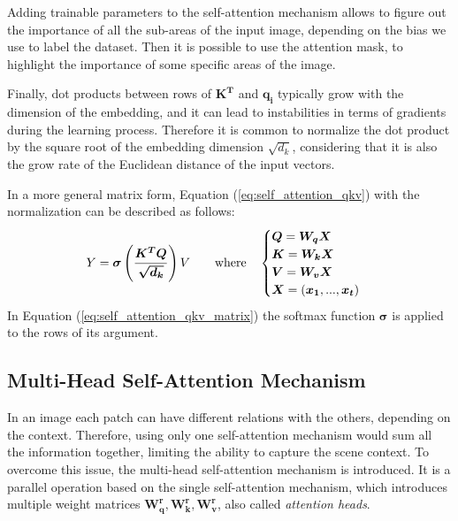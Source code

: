 Adding trainable parameters to the self-attention mechanism allows to figure out 
the importance of all the sub-areas of the input image, depending on the bias we 
use to label the dataset. Then it is possible to use the attention mask, to 
highlight the importance of some specific areas of the image.

Finally, dot products between rows of $\boldsymbol{K^T}$ and 
$\boldsymbol{q_i}$ typically grow with the dimension of the embedding, 
and it can lead to instabilities in terms of gradients during the learning 
process. Therefore it is common to normalize the dot product by the square root 
of the embedding dimension $\sqrt{d_k}$, considering that it is also the 
grow rate of the Euclidean distance of the input vectors.

In a more general matrix form, Equation (\ref{eq:self_attention_qkv}) with the 
normalization can be 
described as follows:
\begin{equation}
Y = \boldsymbol{\sigma}\left(\boldsymbol{\frac{K^T Q}{\sqrt{d_k}}}\right) V\\
\qquad
\text{where}
\quad
\begin{cases}
    \boldsymbol{Q} = \boldsymbol{W_q X} \\
    \boldsymbol{K} = \boldsymbol{W_k X} \\
    \boldsymbol{V} = \boldsymbol{W_v X} \\
    \boldsymbol{X} = (\boldsymbol{x_1}, ..., \boldsymbol{x_t})
\end{cases}
\label{eq:self_attention_qkv_matrix}
\end{equation}
In Equation (\ref{eq:self_attention_qkv_matrix}) the softmax function 
$\boldsymbol{\sigma}$ is applied to the rows of its argument.


\subsection{Multi-Head Self-Attention Mechanism}
In an image each patch can have different relations with the others, depending 
on the context. Therefore, using only one self-attention mechanism would sum all 
the information together, limiting the ability to capture the scene context. 
To overcome this issue, the multi-head self-attention mechanism is introduced.
It is a parallel operation based on the single self-attention mechanism, which 
introduces multiple weight matrices $\boldsymbol{W_q^r, W_k^r, W_v^r}$, also 
called \emph{attention heads}.

